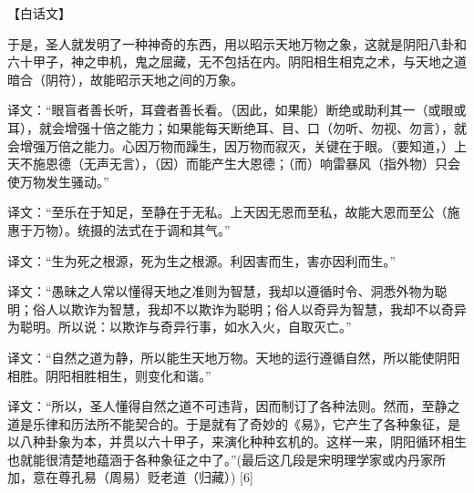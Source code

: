 \documentclass[12pt,UTF8]{ctexbook}
\begin{document}
【白话文】


于是，圣人就发明了一种神奇的东西，用以昭示天地万物之象，这就是阴阳八卦和六十甲子，神之申机，鬼之屈藏，无不包括在内。阴阳相生相克之术，与天地之道暗合（阴符），故能昭示天地之间的万象。


译文：“眼盲者善长听，耳聋者善长看。（因此，如果能）断绝或助利其一（或眼或耳），就会增强十倍之能力；如果能每天断绝耳、目、口（勿听、勿视、勿言），就会增强万倍之能力。心因万物而躁生，因万物而寂灭，关键在于眼。（要知道，）上天不施恩德（无声无言），（因）而能产生大恩德；（而）响雷暴风（指外物）只会使万物发生骚动。”

译文：“至乐在于知足，至静在于无私。上天因无恩而至私，故能大恩而至公（施惠于万物）。统摄的法式在于调和其气。”

译文：“生为死之根源，死为生之根源。利因害而生，害亦因利而生。”

译文：“愚昧之人常以懂得天地之准则为智慧，我却以遵循时令、洞悉外物为聪明；俗人以欺诈为智慧，我却不以欺诈为聪明；俗人以奇异为智慧，我却不以奇异为聪明。所以说：以欺诈与奇异行事，如水入火，自取灭亡。”

译文：“自然之道为静，所以能生天地万物。天地的运行遵循自然，所以能使阴阳相胜。阴阳相胜相生，则变化和谐。”







译文：“所以，圣人懂得自然之道不可违背，因而制订了各种法则。然而，至静之道是乐律和历法所不能契合的。于是就有了奇妙的《易》，它产生了各种象征，是以八种卦象为本，并贯以六十甲子，来演化种种玄机的。这样一来，阴阳循环相生也就能很清楚地蕴涵于各种象征之中了。”(最后这几段是宋明理学家或内丹家所加，意在尊孔易（周易）贬老道（归藏）) [6]

\backmatter
\end{document}
